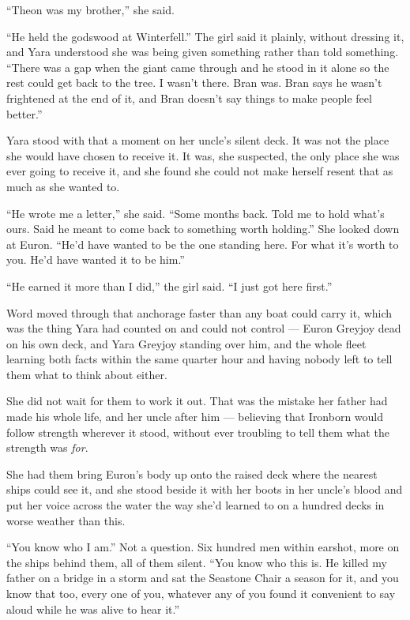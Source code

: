 “Theon was my brother,” she said.

“He held the godswood at Winterfell.” The girl said it plainly, without dressing it, and Yara understood she was being given something rather than told something. “There was a gap when the giant came through and he stood in it alone so the rest could get back to the tree. I wasn’t there. Bran was. Bran says he wasn’t frightened at the end of it, and Bran doesn’t say things to make people feel better.”

Yara stood with that a moment on her uncle’s silent deck. It was not the place she would have chosen to receive it. It was, she suspected, the only place she was ever going to receive it, and she found she could not make herself resent that as much as she wanted to.

“He wrote me a letter,” she said. “Some months back. Told me to hold what’s ours. Said he meant to come back to something worth holding.” She looked down at Euron. “He’d have wanted to be the one standing here. For what it’s worth to you. He’d have wanted it to be him.”

“He earned it more than I did,” the girl said. “I just got here first.”

\sceneBreak

Word moved through that anchorage faster than any boat could carry it, which was the thing Yara had counted on and could not control — Euron Greyjoy dead on his own deck, and Yara Greyjoy standing over him, and the whole fleet learning both facts within the same quarter hour and having nobody left to tell them what to think about either.

She did not wait for them to work it out. That was the mistake her father had made his whole life, and her uncle after him — believing that Ironborn would follow strength wherever it stood, without ever troubling to tell them what the strength was \textit{for}.

She had them bring Euron’s body up onto the raised deck where the nearest ships could see it, and she stood beside it with her boots in her uncle’s blood and put her voice across the water the way she’d learned to on a hundred decks in worse weather than this.

“You know who I am.” Not a question. Six hundred men within earshot, more on the ships behind them, all of them silent. “You know who this is. He killed my father on a bridge in a storm and sat the Seastone Chair a season for it, and you know that too, every one of you, whatever any of you found it convenient to say aloud while he was alive to hear it.”

